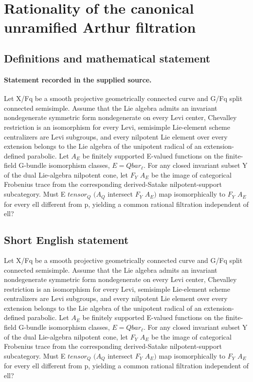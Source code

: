 \documentclass[11pt]{article}
\begin{document}
\section*{Rationality of the canonical unramified Arthur filtration}\label{statement}
\subsection{Definitions and mathematical statement}
\paragraph{Statement recorded in the supplied source.}
Let X/Fq be a smooth projective geometrically connected curve and G/Fq split connected semisimple. Assume that the Lie algebra admits an invariant nondegenerate symmetric form nondegenerate on every Levi center, Chevalley restriction is an isomorphism for every Levi, semisimple Lie-element scheme centralizers are Levi subgroups, and every nilpotent Lie element over every extension belongs to the Lie algebra of the unipotent radical of an extension-defined parabolic. Let $A_E$ be finitely supported E-valued functions on the finite-field G-bundle isomorphism classes, $E=Qbar_\ell $. For any closed invariant subset Y of the dual Lie-algebra nilpotent cone, let $F_Y$ $A_E$ be the image of categorical Frobenius trace from the corresponding derived-Satake nilpotent-support subcategory. Must E $tensor_Q$ $(A_Q$ intersect $F_Y$ $A_E)$ map isomorphically to $F_Y$ $A_E$ for every ell different from p, yielding a common rational filtration independent of ell?
\subsection{Short English statement}
Let X/Fq be a smooth projective geometrically connected curve and G/Fq split connected semisimple. Assume that the Lie algebra admits an invariant nondegenerate symmetric form nondegenerate on every Levi center, Chevalley restriction is an isomorphism for every Levi, semisimple Lie-element scheme centralizers are Levi subgroups, and every nilpotent Lie element over every extension belongs to the Lie algebra of the unipotent radical of an extension-defined parabolic. Let $A_E$ be finitely supported E-valued functions on the finite-field G-bundle isomorphism classes, $E=Qbar_\ell $. For any closed invariant subset Y of the dual Lie-algebra nilpotent cone, let $F_Y$ $A_E$ be the image of categorical Frobenius trace from the corresponding derived-Satake nilpotent-support subcategory. Must E $tensor_Q$ $(A_Q$ intersect $F_Y$ $A_E)$ map isomorphically to $F_Y$ $A_E$ for every ell different from p, yielding a common rational filtration independent of ell?
\end{document}
